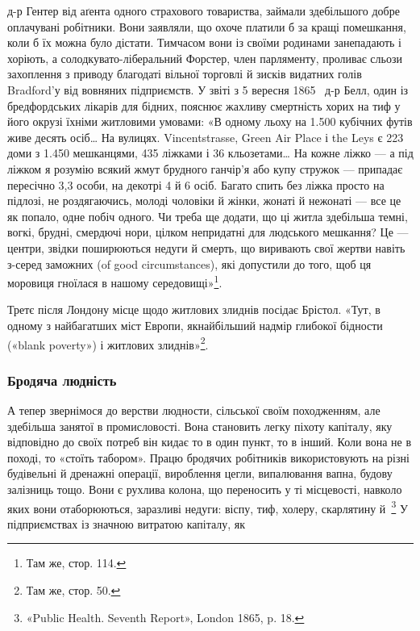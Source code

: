 д-р Гентер від аґента одного страхового товариства, займали
здебільшого добре оплачувані робітники. Вони заявляли, що
охоче платили б за кращі помешкання, коли б їх можна було
дістати. Тимчасом вони із своїми родинами занепадають і хоріють,
а солодкувато-ліберальний Форстер, член парляменту, проливає
сльози захоплення з приводу благодаті вільної торговлі й зисків
видатних голів Bradford’у від вовняних підприємств. У звіті
з 5 вересня 1865~ д-р Белл, один із бредфордських лікарів для
бідних, пояснює жахливу смертність хорих на тиф у його окрузі
їхніми житловими умовами: «В одному льоху на \num{1.500} кубічних
футів живе десять осіб\dots{} На вулицях. Vincentstrasse, Green
Air Place і the Leys є 223 доми з \num{1.450} мешканцями, 435 ліжками
і 36 кльозетами\dots{} На кожне ліжко — а під ліжком я розумію
всякий жмут брудного ганчір’я або купу стружок — припадає
пересічно 3,3 особи, на декотрі 4 й 6 осіб. Багато спить без ліжка
просто на підлозі, не роздягаючись, молоді чоловіки й жінки,
жонаті й нежонаті — все це як попало, одне побіч одного. Чи
треба ще додати, що ці житла здебільша темні, вогкі, брудні,
смердючі нори, цілком непридатні для людського мешкання?
Це — центри, звідки поширюються недуги й смерть, що виривають
свої жертви навіть з-серед заможних (of good circumstances),
які допустили до того, щоб ця моровиця гноїлася в нашому
середовищі»\footnote{
Там же, стор. 114.
}.

Третє після Лондону місце щодо житлових злиднів посідає
Брістол. «Тут, в одному з найбагатших міст Европи, якнайбільший
надмір глибокої бідности («blank poverty») і житлових
злиднів»\footnote{
Там же, стор. 50.
}.

\subsubsection{Бродяча людність}

А тепер звернімося до верстви людности, сільської своїм походженням,
але здебільша занятої в промисловості. Вона становить
легку піхоту капіталу, яку відповідно до своїх потреб
він кидає то в один пункт, то в інший. Коли вона не в поході,
то «стоїть табором». Працю бродячих робітників використовують
на різні будівельні й дренажні операції, вироблення цегли,
випалювання вапна, будову залізниць тощо. Вони є рухлива
колона, що переносить у ті місцевості, навколо яких вони отаборюються,
заразливі недуги: віспу, тиф, холеру, скарлятину
й~\footnote{
«Public Health. Seventh Report», London 1865, p. 18.
} У підприємствах із значною витратою капіталу, як
\parbreak{}  %
